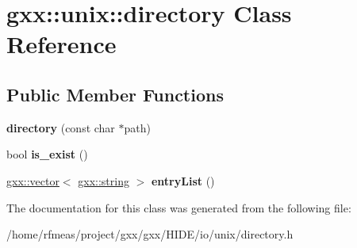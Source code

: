 \hypertarget{classgxx_1_1unix_1_1directory}{}\section{gxx\+:\+:unix\+:\+:directory Class Reference}
\label{classgxx_1_1unix_1_1directory}
\subsection*{Public Member Functions}
\begin{DoxyCompactItemize}
\item 
{\bfseries directory} (const char $\ast$path)\hypertarget{classgxx_1_1unix_1_1directory_a32ad84cf9bf95cc04b0b932656630311}{}\label{classgxx_1_1unix_1_1directory_a32ad84cf9bf95cc04b0b932656630311}

\item 
bool {\bfseries is\+\_\+exist} ()\hypertarget{classgxx_1_1unix_1_1directory_a3e36c1cf11dbf4468df302e1f1bbad57}{}\label{classgxx_1_1unix_1_1directory_a3e36c1cf11dbf4468df302e1f1bbad57}

\item 
\hyperlink{classgxx_1_1vector}{gxx\+::vector}$<$ \hyperlink{classgxx_1_1basic__string}{gxx\+::string} $>$ {\bfseries entry\+List} ()\hypertarget{classgxx_1_1unix_1_1directory_a626d2400492cf3a86ae417a047a12182}{}\label{classgxx_1_1unix_1_1directory_a626d2400492cf3a86ae417a047a12182}

\end{DoxyCompactItemize}


The documentation for this class was generated from the following file\+:\begin{DoxyCompactItemize}
\item 
/home/rfmeas/project/gxx/gxx/\+H\+I\+D\+E/io/unix/directory.\+h\end{DoxyCompactItemize}
